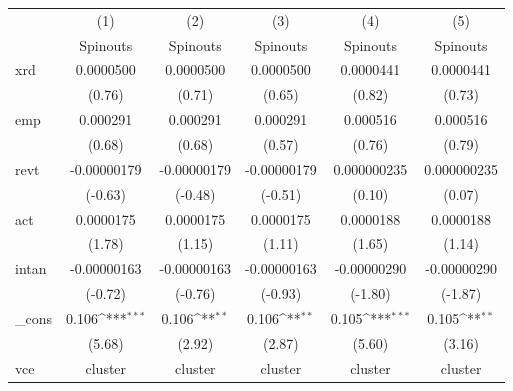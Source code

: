 {
\def\sym#1{\ifmmode^{#1}\else\(^{#1}\)\fi}
\begin{tabular}{l*{5}{c}}
\hline\hline
            &\multicolumn{1}{c}{(1)}&\multicolumn{1}{c}{(2)}&\multicolumn{1}{c}{(3)}&\multicolumn{1}{c}{(4)}&\multicolumn{1}{c}{(5)}\\
            &\multicolumn{1}{c}{Spinouts}&\multicolumn{1}{c}{Spinouts}&\multicolumn{1}{c}{Spinouts}&\multicolumn{1}{c}{Spinouts}&\multicolumn{1}{c}{Spinouts}\\
\hline
xrd         &   0.0000500         &   0.0000500         &   0.0000500         &   0.0000441         &   0.0000441         \\
            &      (0.76)         &      (0.71)         &      (0.65)         &      (0.82)         &      (0.73)         \\
[1em]
emp         &    0.000291         &    0.000291         &    0.000291         &    0.000516         &    0.000516         \\
            &      (0.68)         &      (0.68)         &      (0.57)         &      (0.76)         &      (0.79)         \\
[1em]
revt        & -0.00000179         & -0.00000179         & -0.00000179         & 0.000000235         & 0.000000235         \\
            &     (-0.63)         &     (-0.48)         &     (-0.51)         &      (0.10)         &      (0.07)         \\
[1em]
act         &   0.0000175         &   0.0000175         &   0.0000175         &   0.0000188         &   0.0000188         \\
            &      (1.78)         &      (1.15)         &      (1.11)         &      (1.65)         &      (1.14)         \\
[1em]
intan       & -0.00000163         & -0.00000163         & -0.00000163         & -0.00000290         & -0.00000290         \\
            &     (-0.72)         &     (-0.76)         &     (-0.93)         &     (-1.80)         &     (-1.87)         \\
[1em]
\_cons      &       0.106\sym{***}&       0.106\sym{**} &       0.106\sym{**} &       0.105\sym{***}&       0.105\sym{**} \\
            &      (5.68)         &      (2.92)         &      (2.87)         &      (5.60)         &      (3.16)         \\
\hline
vce         &     cluster         &     cluster         &     cluster         &     cluster         &     cluster         \\

\end{tabular}}
